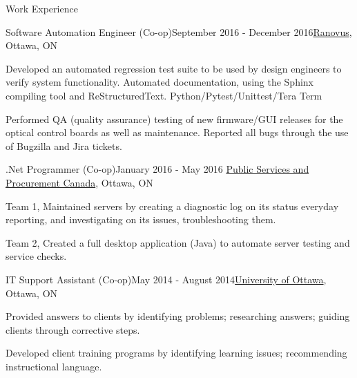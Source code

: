 \documentclass{resume} %
\begin{document}
\begin{rSection}{Work Experience}
\begin{rSubsection}{Software Automation Engineer (Co-op)}{September 2016 - December 2016}{\href{https://ranovus.com/}{Ranovus}, Ottawa, ON} {}
\item Developed an automated regression test suite to be used by design engineers to verify system functionality. Automated documentation, using the Sphinx compiling tool and ReStructuredText. Python/Pytest/Unittest/Tera Term

\item Performed QA (quality assurance) testing of new firmware/GUI releases for the optical control boards as well as maintenance. Reported all bugs through the use of Bugzilla and Jira tickets.


\end{rSubsection}


\begin{rSubsection}{.Net Programmer (Co-op)}{January 2016 - May 2016} {\href{https://www.tpsgc-pwgsc.gc.ca/comm/index-eng.html}{Public Services and Procurement Canada}, Ottawa, ON} {} 

\item Team 1, Maintained servers by creating a diagnostic log on its status everyday reporting, and investigating on its issues, troubleshooting them.

\item Team 2, Created a full desktop application (Java) to automate server testing and service checks.

\end{rSubsection}


\begin{rSubsection}{IT Support Assistant (Co-op)}{May 2014 - August 2014}{\href{https://www.uottawa.ca/en}{University of Ottawa}, Ottawa, ON} {}

\item Provided answers to clients by identifying problems; researching answers; guiding clients through corrective steps.

\item Developed client training programs by identifying learning issues; recommending instructional language.

\end{rSubsection}
\end{rSection}

\end{document}
